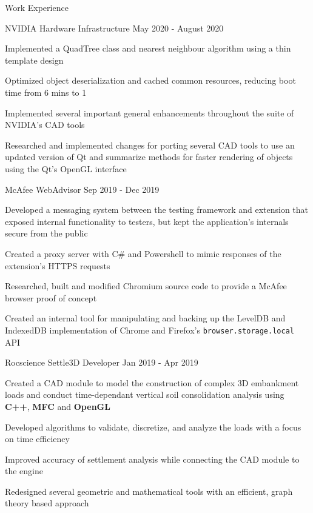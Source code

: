 \documentclass{resume} %
\begin{document}
\begin{rSection}{Work Experience}
    
    \begin{workexperience}
        {NVIDIA}
        {Hardware Infrastructure}
        {May 2020 - August 2020}
        {
            \item Implemented a QuadTree class and nearest neighbour algorithm using a thin template design
            \item Optimized object deserialization and cached common resources, reducing boot time from 6 mins to 1
            \item Implemented several important general enhancements throughout the suite of NVIDIA's CAD tools
            \item Researched and implemented changes for porting several CAD tools to use an updated version of Qt and summarize methods for faster rendering of objects using the Qt's OpenGL interface
        }
    \end{workexperience}
    
    \begin{workexperience}
        {McAfee}
        {WebAdvisor}
        {Sep 2019 - Dec 2019}
        {
            \item Developed a messaging system between the testing framework and extension that exposed internal functionality to testers, but kept the application's internals secure from the public
            \item Created a proxy server with C\# and Powershell to mimic responses of the extension's HTTPS requests  
            \item Researched, built and modified Chromium source code to provide a McAfee browser proof of concept 
            \item Created an internal tool for manipulating and backing up the LevelDB and IndexedDB implementation of Chrome and Firefox's \texttt{browser.storage.local} API
        }
    \end{workexperience}

    \begin{workexperience}
        {Rocscience}
        {Settle3D Developer}
        {Jan 2019 - Apr 2019}
        {
            \item Created a CAD module to model the construction of complex 3D embankment loads and 
            conduct time-dependant vertical soil consolidation analysis using \textbf{C++}, \textbf{MFC} and \textbf{OpenGL}
            \item Developed algorithms to validate, discretize, and analyze the loads with a focus on time efficiency
            \item Improved accuracy of settlement analysis while connecting the CAD module to the engine
            \item Redesigned several geometric and mathematical tools with an efficient, graph theory based approach
        }
    \end{workexperience}
    

\end{rSection}
\end{document}
